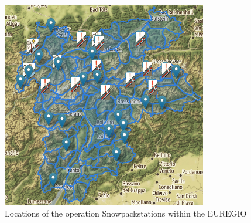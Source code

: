 \begin{figure}[ht]
    \centering
    \includegraphics[width=0.8\textwidth]{Figures/figures_avapro/station_comp/station_comp_2022_02_04.png}
    \caption{Locations of the operation Snowpackstations within the EUREGIO}
    \label{fig:Snowpackstations_eruegio}
\end{figure}

